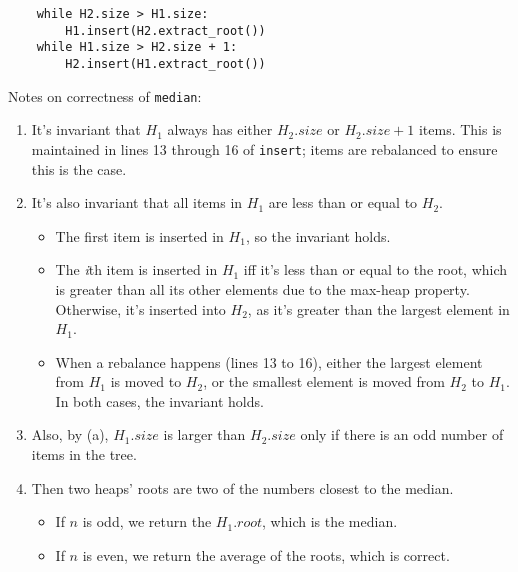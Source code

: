 \documentclass{article}
\begin{document}
\begin{enumerate}
\begin{lstlisting}
    while H2.size > H1.size:
        H1.insert(H2.extract_root())
    while H1.size > H2.size + 1:
        H2.insert(H1.extract_root())
\end{lstlisting}
    Notes on correctness of \texttt{median}:
    \begin{enumerate}
        \item It's invariant that $H_1$ always has either $H_2.size$ or $H_2.size + 1$ items. This is maintained in lines 13 through 16 of \texttt{insert}; items are rebalanced to ensure this is the case.
        \item It's also invariant that all items in $H_1$ are less than or equal to $H_2$.
            \begin{itemize}
            \item The first item is inserted in $H_1$, so the invariant holds.
            \item The \textit{i}th item is inserted in $H_1$ iff it's less than or equal to the root, which is greater than all its other elements due to the max-heap property. Otherwise, it's inserted into $H_2$, as it's greater than the largest element in $H_1$.
            \item When a rebalance happens (lines 13 to 16), either the largest element from $H_1$ is moved to $H_2$, or the smallest element is moved from $H_2$ to $H_1$. In both cases, the invariant holds.
            \end{itemize}
        \item Also, by (a), $H_1.size$ is larger than $H_2.size$ only if there is an odd number of items in the tree.
        \item Then two heaps' roots are two of the numbers closest to the median.
            \begin{itemize}
            \item If $n$ is odd, we return the $H_1.root$, which is the median.
            \item If $n$ is even, we return the average of the roots, which is correct.
            \end{itemize}
    \end{enumerate}
\end{enumerate}
\end{document}
